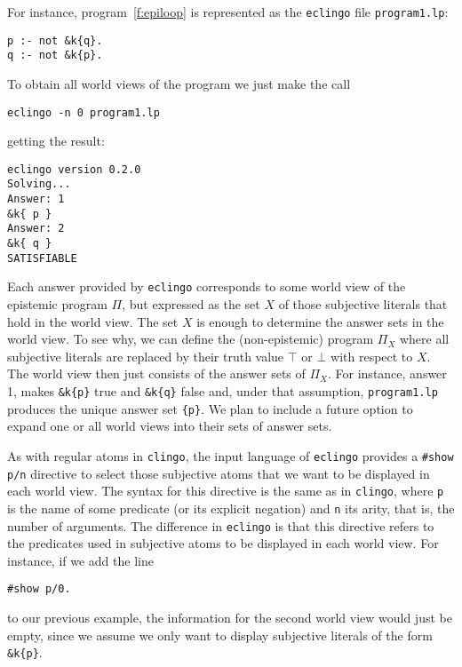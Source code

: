 \documentclass{new_tlp}
\def\eclingo{{\tt eclingo}}
\def\clingo{{\tt clingo}}
\begin{document}
For instance, program~\eqref{f:epiloop} is represented as the \eclingo{} file {\tt program1.lp}:
\begin{Verbatim}[frame=single]
p :- not &k{q}.
q :- not &k{p}.
\end{Verbatim}
To obtain all world views of the program we just make the call
\begin{verbatim}
eclingo -n 0 program1.lp
\end{verbatim}
getting the result:
\begin{Verbatim}[frame=single]
eclingo version 0.2.0
Solving...
Answer: 1
&k{ p }
Answer: 2
&k{ q }
SATISFIABLE
\end{Verbatim}
Each answer provided by \eclingo{} corresponds to some world view of the epistemic program $\Pi$, but expressed as the set $X$ of those subjective literals that hold in the world view.
%
The set $X$ is enough to determine the answer sets in the world view.
%
To see why, we can define the (non-epistemic) program $\Pi_X$ where all subjective literals are replaced by their truth value $\top$ or $\bot$ with respect to $X$.
%
The world view then just consists of the answer sets of $\Pi_X$.
%
For instance, answer 1, makes {\tt \&k\{p\}} true and {\tt \&k\{q\}} false and, under that assumption, {\tt program1.lp} produces the unique answer set {\tt \{p\}}.
%
We plan to include a future option to expand one or all world views into their sets of answer sets.


As with regular atoms in \clingo,
the input language of  \eclingo{} provides a \mbox{\tt \#show p/n} directive to select those subjective atoms that we want to be displayed in each world view.
%
The syntax for this directive is the same as in \clingo{}, where {\tt p} is the name of some predicate (or its explicit negation) and {\tt n} its arity, that is, the number of arguments.
%
The difference in \eclingo{} is that this directive refers to the predicates used in subjective atoms to be displayed in each world view.
For instance, if we add the line
\begin{Verbatim}[frame=single]
#show p/0.
\end{Verbatim}
to our previous example, the information for the second world view would just be empty, since we assume we only want to display subjective literals of the form {\tt \&k\{p\}}.
\end{document}
